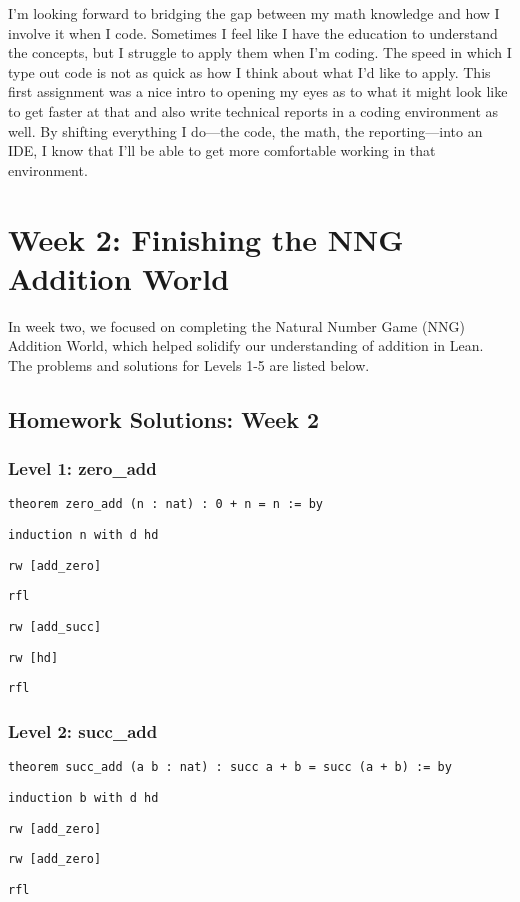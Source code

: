 \documentclass{article}
\begin{document}
I'm looking forward to bridging the gap between my math knowledge and how I involve it when I code. Sometimes I feel like I have the education to understand the concepts, but I struggle to apply them when I'm coding. The speed in which I type out code is not as quick as how I think about what I'd like to apply. This first assignment was a nice intro to opening my eyes as to what it might look like to get faster at that and also write technical reports in a coding environment as well. By shifting everything I do—the code, the math, the reporting—into an IDE, I know that I'll be able to get more comfortable working in that environment.

\section*{Week 2: Finishing the NNG Addition World}
In week two, we focused on completing the Natural Number Game (NNG) Addition World, which helped solidify our understanding of addition in Lean. The problems and solutions for Levels 1-5 are listed below.

\subsection*{Homework Solutions: Week 2}

\subsubsection*{Level 1: zero\_add}
\texttt{theorem zero\_add (n : nat) : 0 + n = n := by}

\texttt{induction n with d hd}

\texttt{rw [add\_zero]}

\texttt{rfl}

\texttt{rw [add\_succ]}

\texttt{rw [hd]}

\texttt{rfl}

\subsubsection*{Level 2: succ\_add}
\texttt{theorem succ\_add (a b : nat) : succ a + b = succ (a + b) := by}

\texttt{induction b with d hd}

\texttt{rw [add\_zero]}

\texttt{rw [add\_zero]}

\texttt{rfl}
\end{document}
